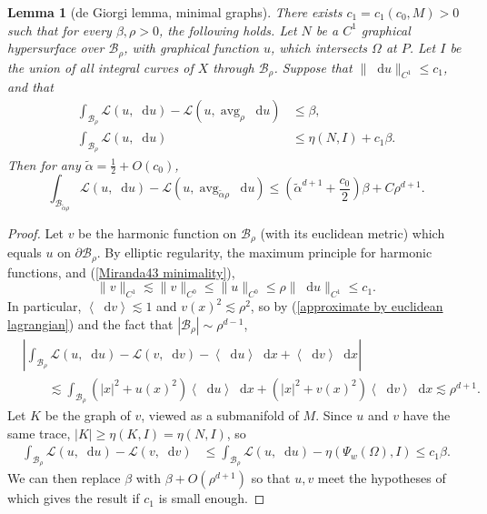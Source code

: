 \documentclass[reqno,11pt]{amsart}
\DeclareMathOperator{\avg}{avg}
\newcommand*\dif{\mathop{}\!\mathrm{d}}
\newcommand{\Lagrange}{\mathscr L}
\def\Japan#1{\left \langle #1 \right \rangle}
\newtheorem{lemma}[theorem]{Lemma}
\theoremstyle{definition}
\numberwithin{equation}{section}
\begin{document}
\begin{lemma}[de Giorgi lemma, minimal graphs]\label{Miranda43}
There exists $c_1 = c_1(c_0, M) > 0$ such that for every $\beta, \rho > 0$, the following holds.
Let $N$ be a $C^1$ graphical hypersurface over $\mathscr B_\rho$, with graphical function $u$, which intersects $\Omega$ at $P$.
Let $I$ be the union of all integral curves of $X$ through $\mathscr B_\rho$.
Suppose that $\|\dif u\|_{C^1} \leq c_1$, and that
\begin{align}
\int_{\mathscr B_\rho} \Lagrange(u, \dif u) - \Lagrange(u, \avg_\rho \dif u) &\leq \beta \label{Miranda43 oscillation}, \\
\int_{\mathscr B_\rho} \Lagrange(u, \dif u) &\leq \eta(N, I) + c_1 \beta \label{Miranda43 minimality}.
\end{align}
Then for any $\tilde \alpha = \frac{1}{2} + O(c_0)$,
\begin{equation}\label{Miranda43 concl}
\int_{\mathscr B_{\tilde \alpha \rho}} \Lagrange(u, \dif u) - \Lagrange(u, \avg_{\tilde \alpha \rho} \dif u) \leq \left(\tilde \alpha^{d + 1} + \frac{c_0}{2}\right) \beta + C\rho^{d + 1}.
\end{equation}
\end{lemma}
\begin{proof}
Let $v$ be the harmonic function on $\mathscr B_\rho$ (with its euclidean metric) which equals $u$ on $\partial \mathscr B_\rho$.
By elliptic regularity, the maximum principle for harmonic functions, and (\ref{Miranda43 minimality}),
$$\|v\|_{C^1} \lesssim \|v\|_{C^0} \leq \|u\|_{C^0} \leq \rho \|\dif u\|_{C^1} \leq c_1.$$
In particular, $\Japan{\dif v} \lesssim 1$ and $v(x)^2 \lesssim \rho^2$, so by (\ref{approximate by euclidean lagrangian}) and the fact that $|\mathscr B_\rho| \sim \rho^{d - 1}$,
\begin{align*}
&\left|\int_{\mathscr B_\rho} \Lagrange(u, \dif u) - \Lagrange(v, \dif v) - \Japan{\dif u} \dif x + \Japan{\dif v} \dif x\right| \\
&\qquad \lesssim \int_{\mathscr B_\rho} (|x|^2 + u(x)^2) \Japan{\dif u} \dif x + (|x|^2 + v(x)^2) \Japan{\dif v} \dif x
\lesssim \rho^{d + 1}.
\end{align*}
Let $K$ be the graph of $v$, viewed as a submanifold of $M$.
Since $u$ and $v$ have the same trace, $|K| \geq \eta(K, I) = \eta(N, I)$, so
\begin{align*}
\int_{\mathscr B_\rho} \Lagrange(u, \dif u) - \Lagrange(v, \dif v) &\leq \int_{\mathscr B_\rho} \Lagrange(u, \dif u) - \eta(\Psi_w(\Omega), I) \leq c_1 \beta.
\end{align*}
We can then replace $\beta$ with $\beta + O(\rho^{d + 1})$ so that $u, v$ meet the hypotheses of \cite[Lemma 6.2]{Giusti77} which gives the result if $c_1$ is small enough.
\end{proof}
\end{document}
